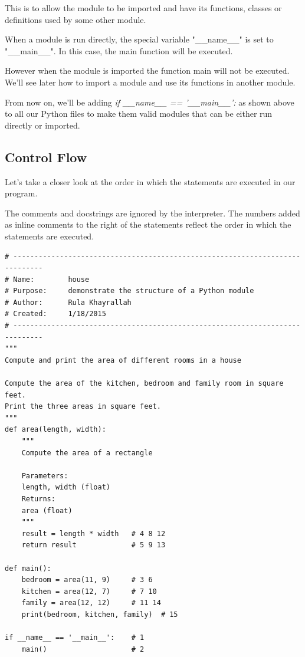 \documentclass{article}
\begin{document}
This is to allow the module to be  imported and have its functions, classes or definitions used by some other module.  

When a module is run directly, the special variable "{\_}{\_}name{\_}{\_}" is set to "{\_}{\_}main{\_}{\_}".   In this case, the main function will be executed.  

However when the module is imported the function main will not be executed.  We'll see later how to import a module and use its functions in another module.  

From now on, we'll be adding \textit{if {\_}{\_}name{\_}{\_} == '{\_}{\_}main{\_}{\_}':} as shown above to all our Python files to make them valid modules that can be either run directly or imported.

\subsection{Control Flow}

Let's take a closer look at the order in which the statements are executed in our program.

The comments and docstrings are ignored by the interpreter.   The numbers added as inline comments to the right of the statements reflect the order in which the statements are executed. 

\begin{lstlisting}
# -----------------------------------------------------------------------------
# Name:        house
# Purpose:     demonstrate the structure of a Python module
# Author:      Rula Khayrallah
# Created:     1/18/2015
# -----------------------------------------------------------------------------
"""
Compute and print the area of different rooms in a house

Compute the area of the kitchen, bedroom and family room in square feet.
Print the three areas in square feet.
"""
def area(length, width):
    """
    Compute the area of a rectangle

    Parameters:
    length, width (float)
    Returns:
    area (float)
    """
    result = length * width   # 4 8 12
    return result             # 5 9 13

def main():
    bedroom = area(11, 9)     # 3 6
    kitchen = area(12, 7)     # 7 10
    family = area(12, 12)     # 11 14
    print(bedroom, kitchen, family)  # 15

if __name__ == '__main__':    # 1
    main()                    # 2
\end{lstlisting}
 
\end{document}
